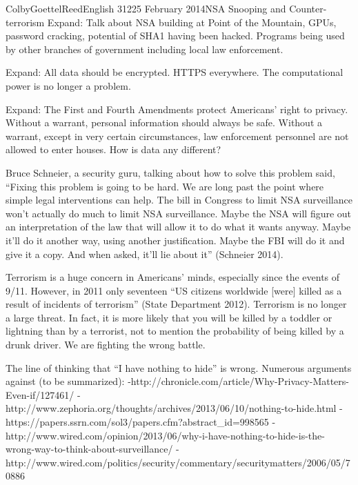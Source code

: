 \documentclass[12pt]{article}
\begin{document}
\begin{mla}{Colby}{Goettel}{Reed}{English 312}{25 February 2014}{NSA Snooping and Counter-terrorism}
Expand: Talk about NSA building at Point of the Mountain, GPUs, password cracking, potential of SHA1 having been hacked. Programs being used by other branches of government including local law enforcement.

Expand: All data should be encrypted. HTTPS everywhere. The computational power is no longer a problem.

Expand: The First and Fourth Amendments protect Americans' right to privacy. Without a warrant, personal information should always be safe. Without a warrant, except in very certain circumstances, law enforcement personnel are not allowed to enter houses. How is data any different?

Bruce Schneier, a security guru, talking about how to solve this problem said, ``Fixing this problem is going to be hard. We are long past the point where simple legal interventions can help. The bill in Congress to limit NSA surveillance won't actually do much to limit NSA surveillance. Maybe the NSA will figure out an interpretation of the law that will allow it to do what it wants anyway. Maybe it'll do it another way, using another justification. Maybe the FBI will do it and give it a copy. And when asked, it'll lie about it'' (Schneier 2014).

Terrorism is a huge concern in Americans' minds, especially since the events of 9/11. However, in 2011 only seventeen ``US citizens worldwide [were] killed as a result of incidents of terrorism'' (State Department 2012). Terrorism is no longer a large threat. In fact, it is more likely that you will be killed by a toddler or lightning than by a terrorist, not to mention the probability of being killed by a drunk driver. We are fighting the wrong battle.

The line of thinking that ``I have nothing to hide'' is wrong. Numerous arguments against (to be summarized):
-http://chronicle.com/article/Why-Privacy-Matters-Even-if/127461/
-http://www.zephoria.org/thoughts/archives/2013/06/10/nothing-to-hide.html
-https://papers.ssrn.com/sol3/papers.cfm?abstract\_id=998565
-http://www.wired.com/opinion/2013/06/why-i-have-nothing-to-hide-is-the-wrong-way-to-think-about-surveillance/
-http://www.wired.com/politics/security/commentary/securitymatters/2006/05/70886


\end{mla}
\end{document}

